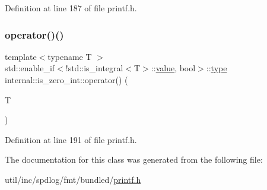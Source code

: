 Definition at line 187 of file printf.\+h.

\mbox{\label{classinternal_1_1is__zero__int_a9d370073f86c153f883e12fd14284d92}} 
\subsubsection{\texorpdfstring{operator()()}{operator()()}\hspace{0.1cm}{\footnotesize\ttfamily [2/2]}}
{\footnotesize\ttfamily template$<$typename T $>$ \\
std\+::enable\+\_\+if$<$!std\+::is\+\_\+integral$<$T$>$\+::\hyperlink{classinternal_1_1value}{value}, bool$>$\+::\hyperlink{namespaceinternal_a8661864098ac0acff9a6dd7e66f59038}{type} internal\+::is\+\_\+zero\+\_\+int\+::operator() (\begin{DoxyParamCaption}\item[{T}]{ }\end{DoxyParamCaption})\hspace{0.3cm}{\ttfamily [inline]}}



Definition at line 191 of file printf.\+h.



The documentation for this class was generated from the following file\+:\begin{DoxyCompactItemize}
\item 
util/inc/spdlog/fmt/bundled/\hyperlink{printf_8h}{printf.\+h}\end{DoxyCompactItemize}
